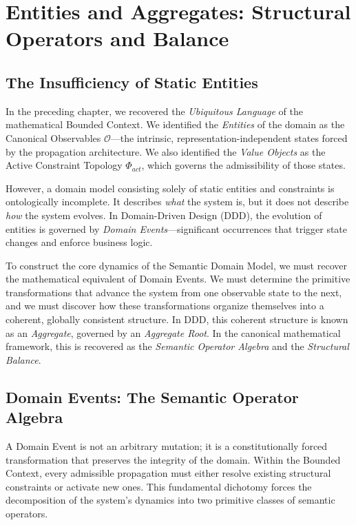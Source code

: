 \documentclass[12pt,openany]{extbook}
\theoremstyle{plain}
\theoremstyle{definition}
\begin{document}
\chapter{Entities and Aggregates: Structural Operators and Balance}

\section{The Insufficiency of Static Entities}

In the preceding chapter, we recovered the \emph{Ubiquitous Language} of the mathematical Bounded Context. We identified the \emph{Entities} of the domain as the Canonical Observables $\mathcal{O}$---the intrinsic, representation-independent states forced by the propagation architecture. We also identified the \emph{Value Objects} as the Active Constraint Topology $\Phi_{act}$, which governs the admissibility of those states.

However, a domain model consisting solely of static entities and constraints is ontologically incomplete. It describes \emph{what} the system is, but it does not describe \emph{how} the system evolves. In Domain-Driven Design (DDD), the evolution of entities is governed by \emph{Domain Events}---significant occurrences that trigger state changes and enforce business logic. 

To construct the core dynamics of the Semantic Domain Model, we must recover the mathematical equivalent of Domain Events. We must determine the primitive transformations that advance the system from one observable state to the next, and we must discover how these transformations organize themselves into a coherent, globally consistent structure. In DDD, this coherent structure is known as an \emph{Aggregate}, governed by an \emph{Aggregate Root}. In the canonical mathematical framework, this is recovered as the \emph{Semantic Operator Algebra} and the \emph{Structural Balance}.

\section{Domain Events: The Semantic Operator Algebra}

A Domain Event is not an arbitrary mutation; it is a constitutionally forced transformation that preserves the integrity of the domain. Within the Bounded Context, every admissible propagation must either resolve existing structural constraints or activate new ones. This fundamental dichotomy forces the decomposition of the system's dynamics into two primitive classes of semantic operators.
\end{document}
